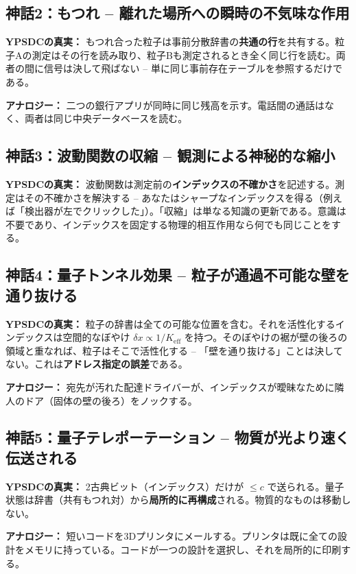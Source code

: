 \documentclass[12pt,a4paper]{article}
\begin{document}
	\subsection{神話2：もつれ -- 離れた場所への瞬時の不気味な作用}
	\textbf{YPSDCの真実：} もつれ合った粒子は事前分散辞書の\textbf{共通の行}を共有する。粒子Aの測定はその行を読み取り、粒子Bも測定されるとき全く同じ行を読む。両者の間に信号は決して飛ばない -- 単に同じ事前存在テーブルを参照するだけである。
	\par
	\textbf{アナロジー：} 二つの銀行アプリが同時に同じ残高を示す。電話間の通話はなく、両者は同じ中央データベースを読む。
	
	\subsection{神話3：波動関数の収縮 -- 観測による神秘的な縮小}
	\textbf{YPSDCの真実：} 波動関数は測定前の\textbf{インデックスの不確かさ}を記述する。測定はその不確かさを解決する -- あなたはシャープなインデックスを得る（例えば「検出器が左でクリックした」）。「収縮」は単なる知識の更新である。意識は不要であり、インデックスを固定する物理的相互作用なら何でも同じことをする。
	
	\subsection{神話4：量子トンネル効果 -- 粒子が通過不可能な壁を通り抜ける}
	\textbf{YPSDCの真実：} 粒子の辞書は全ての可能な位置を含む。それを活性化するインデックスは空間的なぼやけ \(\delta x \propto 1/K_{\mathrm{eff}}\) を持つ。そのぼやけの裾が壁の後ろの領域と重なれば、粒子はそこで活性化する -- 「壁を通り抜ける」ことは決してない。これは\textbf{アドレス指定の誤差}である。
	\par
	\textbf{アナロジー：} 宛先が汚れた配達ドライバーが、インデックスが曖昧なために隣人のドア（固体の壁の後ろ）をノックする。
	
	\subsection{神話5：量子テレポーテーション -- 物質が光より速く伝送される}
	\textbf{YPSDCの真実：} 2古典ビット（インデックス）だけが \(\le c\) で送られる。量子状態は辞書（共有もつれ対）から\textbf{局所的に再構成}される。物質的なものは移動しない。
	\par
	\textbf{アナロジー：} 短いコードを3Dプリンタにメールする。プリンタは既に全ての設計をメモリに持っている。コードが一つの設計を選択し、それを局所的に印刷する。
	
\end{document}
